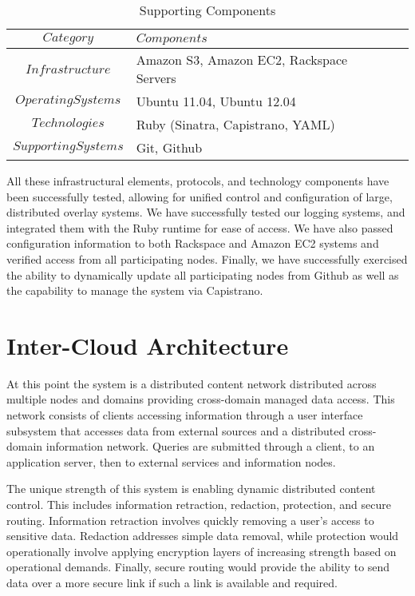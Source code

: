 \begin{table*}[tp] %
\centering %
\begin{tabular}{clcc}
\toprule %
$Category$ 				& $Components$ 								\\\toprule %
$Infrastructure$ 		& Amazon S3, Amazon EC2, Rackspace Servers 	\\\midrule
$Operating Systems$		& Ubuntu 11.04, Ubuntu 12.04 				\\\midrule
$Technologies$			& Ruby (Sinatra, Capistrano, YAML) 			\\\midrule
$Supporting Systems$	& Git, Github 								\\\bottomrule
\end{tabular}
\caption{Supporting Components}
\label{table:model:components}
\end{table*}

All these infrastructural elements, protocols, and technology components have been successfully tested, allowing for unified control and configuration of large, distributed overlay systems.  We have successfully tested our logging systems, and integrated them with the Ruby runtime for ease of access.  We have also passed configuration information to both Rackspace and Amazon EC2 systems and verified access from all participating nodes.  Finally, we have successfully exercised the ability to dynamically update all participating nodes from Github as well as the capability to manage the system via Capistrano.

\section{Inter-Cloud Architecture}
At this point the system is a distributed content network distributed across multiple nodes and domains providing cross-domain managed data access.  This network consists of clients accessing information through a user interface subsystem that accesses data from external sources and a distributed cross-domain information network.  Queries are submitted through a client, to an application server, then to external services and information nodes.

The unique strength of this system is enabling dynamic distributed content control.  This includes information retraction, redaction, protection, and secure routing.  Information retraction involves quickly removing a user's access to sensitive data.  Redaction addresses simple data removal, while protection would operationally involve applying encryption layers of increasing strength based on operational demands.  Finally, secure routing would provide the ability to send data over a more secure link if such a link is available and required.

